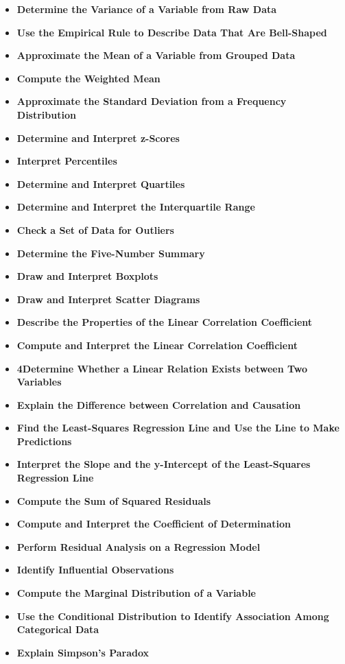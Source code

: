 \documentclass{report}
\begin{document}
\begin{itemize}
            \item \textbf{Determine the Variance of a Variable from Raw Data}
            \item \textbf{Use the Empirical Rule to Describe Data That Are Bell-Shaped}
           \item \textbf{Approximate the Mean of a Variable from Grouped Data}
           \item \textbf{Compute the Weighted Mean}
           \item \textbf{Approximate the Standard Deviation from a Frequency Distribution}
           \item \textbf{Determine and Interpret z-Scores}
           \item \textbf{Interpret Percentiles}
           \item \textbf{Determine and Interpret Quartiles}
           \item \textbf{Determine and Interpret the Interquartile Range}
           \item \textbf{Check a Set of Data for Outliers}
            \item \textbf{Determine the Five-Number Summary}
            \item \textbf{Draw and Interpret Boxplots}
            \item \textbf{Draw and Interpret Scatter Diagrams}
            \item \textbf{Describe the Properties of the Linear Correlation Coefficient}
            \item \textbf{Compute and Interpret the Linear Correlation Coefficient}
            \item \textbf{4Determine Whether a Linear Relation Exists between Two Variables}
            \item \textbf{Explain the Difference between Correlation and Causation}
            \item \textbf{Find the Least-Squares Regression Line and Use the Line to Make Predictions}
            \item \textbf{Interpret the Slope and the y-Intercept of the Least-Squares Regression Line}
            \item \textbf{Compute the Sum of Squared Residuals}
            \item \textbf{Compute and Interpret the Coefficient of Determination}
            \item \textbf{Perform Residual Analysis on a Regression Model}
            \item \textbf{Identify Influential Observations}
            \item \textbf{Compute the Marginal Distribution of a Variable}
            \item \textbf{Use the Conditional Distribution to Identify Association Among Categorical Data}
            \item \textbf{Explain Simpson's Paradox}
        \end{itemize}
\end{document}
